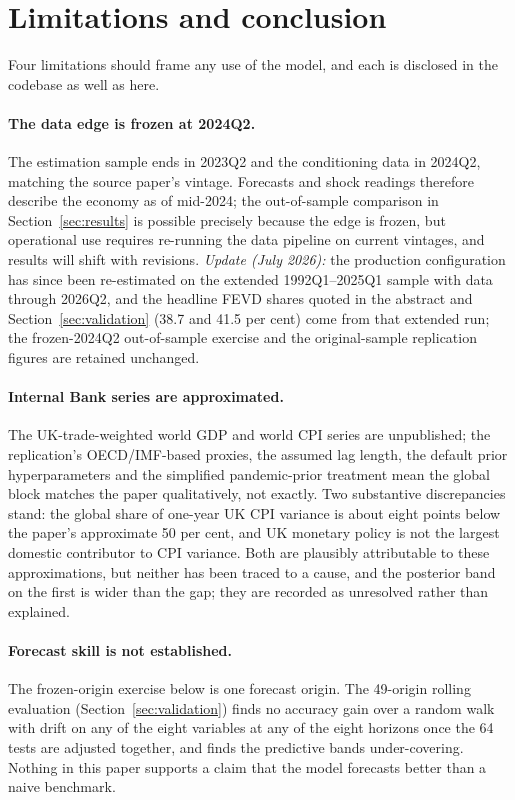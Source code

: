 \section{Limitations and conclusion}
\label{sec:limitations}

Four limitations should frame any use of the model, and each is disclosed in the codebase as well as here.

\paragraph{The data edge is frozen at 2024Q2.} The estimation sample ends in 2023Q2 and the conditioning data in 2024Q2, matching the source paper's vintage. Forecasts and shock readings therefore describe the economy as of mid-2024; the out-of-sample comparison in Section~\ref{sec:results} is possible precisely because the edge is frozen, but operational use requires re-running the data pipeline on current vintages, and results will shift with revisions. \emph{Update (July 2026):} the production configuration has since been re-estimated on the extended 1992Q1--2025Q1 sample with data through 2026Q2, and the headline FEVD shares quoted in the abstract and Section~\ref{sec:validation} (38.7 and 41.5 per cent) come from that extended run; the frozen-2024Q2 out-of-sample exercise and the original-sample replication figures are retained unchanged.

\paragraph{Internal Bank series are approximated.} The UK-trade-weighted world GDP and world CPI series are unpublished; the replication's OECD/IMF-based proxies, the assumed lag length, the default prior hyperparameters and the simplified pandemic-prior treatment mean the global block matches the paper qualitatively, not exactly. Two substantive discrepancies stand: the global share of one-year UK CPI variance is about eight points below the paper's approximate 50 per cent, and UK monetary policy is not the largest domestic contributor to CPI variance. Both are plausibly attributable to these approximations, but neither has been traced to a cause, and the posterior band on the first is wider than the gap; they are recorded as unresolved rather than explained.

\paragraph{Forecast skill is not established.} The frozen-origin exercise below is one forecast origin. The 49-origin rolling evaluation (Section~\ref{sec:validation}) finds no accuracy gain over a random walk with drift on any of the eight variables at any of the eight horizons once the 64 tests are adjusted together, and finds the predictive bands under-covering. Nothing in this paper supports a claim that the model forecasts better than a naive benchmark.

